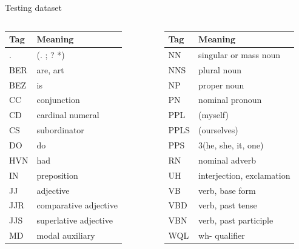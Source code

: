 \documentclass[10pt]{beamer}
\begin{document}
\begin{frame}[fragile]{Testing dataset}
\centering
\begin{columns}
  \begin{tabular}{l l}
    Tag & Meaning \\
    \hline
    . & (. ; ? *) \\
    BER & are, art \\
    BEZ & is \\
    CC &  conjunction  \\
    CD &  cardinal numeral  \\
    CS &  subordinator \\
    DO &  do \\
    HVN & had  \\
    IN &  preposition \\
    JJ &  adjective \\
    JJR & comparative adjective \\
    JJS & superlative adjective \\
    MD &  modal auxiliary  \\
  \end{tabular}
  \begin{tabular}{l l}
    Tag & Meaning \\
    \hline
    NN &  singular or mass noun \\
    NNS & plural noun \\
    NP &  proper noun \\
    PN &  nominal pronoun  \\
    PPL &  (myself) \\
    PPLS &  (ourselves) \\
    PPS & 3(he, she, it, one) \\
    RN &  nominal adverb \\
    UH &  interjection, exclamation \\
    VB &  verb, base form \\
    VBD & verb, past tense \\
    VBN & verb, past participle \\
    WQL & wh- qualifier \\
  \end{tabular}

  
    
\end{columns}    
\end{frame}
\end{document}
